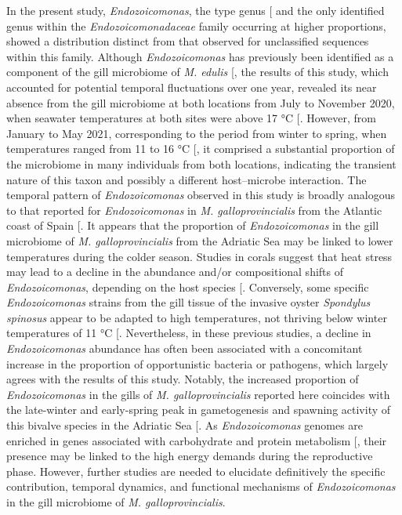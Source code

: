 \documentclass[
  12 pt,
]{article}
\begin{document}
In the present study, \emph{Endozoicomonas}, the type genus {[}\citeproc{ref-Kurahashi2007}{121}{]} and the only identified genus within the \emph{Endozoicomonadaceae} family occurring at higher proportions, showed a distribution distinct from that observed for unclassified sequences within this family. Although \emph{Endozoicomonas} has previously been identified as a component of the gill microbiome of \emph{M. edulis} {[}\citeproc{ref-Schill2017}{110}{]}, the results of this study, which accounted for potential temporal fluctuations over one year, revealed its near absence from the gill microbiome at both locations from July to November 2020, when seawater temperatures at both sites were above 17 \unit{\degreeCelsius} {[}\citeproc{ref-Zurga2024}{45}{]}. However, from January to May 2021, corresponding to the period from winter to spring, when temperatures ranged from 11 to 16 \unit{\degreeCelsius} {[}\citeproc{ref-Zurga2024}{45}{]}, it comprised a substantial proportion of the microbiome in many individuals from both locations, indicating the transient nature of this taxon and possibly a different host--microbe interaction. The temporal pattern of \emph{Endozoicomonas} observed in this study is broadly analogous to that reported for \emph{Endozoicomonas} in \emph{M. galloprovincialis} from the Atlantic coast of Spain {[}\citeproc{ref-Munoz-Martinez2026}{6}{]}. It appears that the proportion of \emph{Endozoicomonas} in the gill microbiome of \emph{M. galloprovincialis} from the Adriatic Sea may be linked to lower temperatures during the colder season. Studies in corals suggest that heat stress may lead to a decline in the abundance and/or compositional shifts of \emph{Endozoicomonas}, depending on the host species {[}\citeproc{ref-Pootakham2019}{122}{]}. Conversely, some specific \emph{Endozoicomonas} strains from the gill tissue of the invasive oyster \emph{Spondylus spinosus} appear to be adapted to high temperatures, not thriving below winter temperatures of 11 \unit{\degreeCelsius} {[}\citeproc{ref-Dor-Roterman2024}{123}{]}. Nevertheless, in these previous studies, a decline in \emph{Endozoicomonas} abundance has often been associated with a concomitant increase in the proportion of opportunistic bacteria or pathogens, which largely agrees with the results of this study. Notably, the increased proportion of \emph{Endozoicomonas} in the gills of \emph{M. galloprovincialis} reported here coincides with the late-winter and early-spring peak in gametogenesis and spawning activity of this bivalve species in the Adriatic Sea {[}\citeproc{ref-Zurga2024}{45}{]}. As \emph{Endozoicomonas} genomes are enriched in genes associated with carbohydrate and protein metabolism {[}\citeproc{ref-Neave2017}{124}{]}, their presence may be linked to the high energy demands during the reproductive phase. However, further studies are needed to elucidate definitively the specific contribution, temporal dynamics, and functional mechanisms of \emph{Endozoicomonas} in the gill microbiome of \emph{M. galloprovincialis}.
\end{document}
